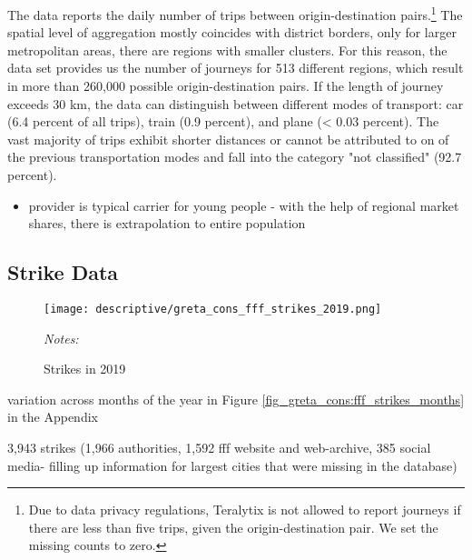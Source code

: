 \documentclass[11pt, a4paper]{article} %
\begin{document}
The data reports the daily number of trips between origin-destination pairs.\footnote{Due to data privacy regulations, Teralytix is not allowed to report journeys if there are less than five trips, given the origin-destination pair. We set the missing counts to zero.} The spatial level of aggregation mostly coincides with district borders, only for larger metropolitan areas, there are regions with smaller clusters. For this reason, the data set provides us the number of journeys for 513 different regions, which result in more than 260,000 possible origin-destination pairs. If the length of journey exceeds 30 km, the data can distinguish between different modes of transport: car (6.4 percent of all trips), train (0.9 percent), and plane (< 0.03 percent). The vast majority of trips exhibit shorter distances or cannot be attributed to on of the previous transportation modes and fall into the category "not classified" (92.7 percent).






\begin{itemize}
	\item provider is typical carrier for young people - with the help of regional market shares, there is extrapolation to entire population
\end{itemize}














\subsection{Strike Data}

\begin{figure}[H]\centering
	\caption{Strikes in 2019}\label{fig_greta_cons:fff_strikes_2019}
	\texttt{[image: descriptive/greta\_cons\_fff\_strikes\_2019.png]}
	\begin{minipage}{0.8\linewidth}
		\scriptsize{\emph{Notes:} }
	\end{minipage}
\end{figure}

variation across months of the year in Figure \ref{fig_greta_cons:fff_strikes_months} in the Appendix


3,943 strikes (1,966 authorities, 1,592 fff website and web-archive, 385 social media- filling up information for largest cities that were missing in the database)
\end{document}
